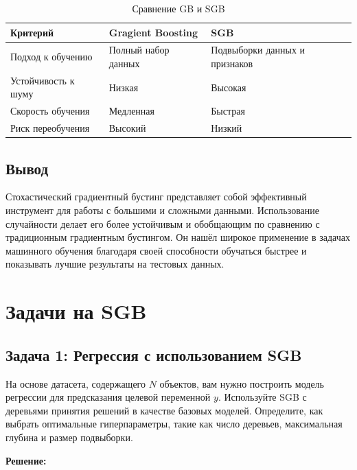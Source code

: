 \begin{table}[h!]
    \centering
    \begin{tabular}{|l|l|l|}
        \hline
        \textbf{Критерий} & \textbf{Gragient Boosting} & \textbf{SGB} \\
        \hline
        Подход к обучению & Полный набор данных                  & Подвыборки данных и признаков            \\
        \hline
        Устойчивость к шуму & Низкая                              & Высокая                                  \\
        \hline
        Скорость обучения  & Медленная                           & Быстрая                                  \\
        \hline
        Риск переобучения  & Высокий                             & Низкий                                   \\
        \hline
    \end{tabular}
    \caption{Сравнение GB и SGB}
\end{table}
\newpage
\subsection{Вывод}

Стохастический градиентный бустинг представляет собой эффективный инструмент для работы с большими и сложными данными. Использование случайности делает его более устойчивым и обобщающим по сравнению с традиционным градиентным бустингом. Он нашёл широкое применение в задачах машинного обучения благодаря своей способности обучаться быстрее и показывать лучшие результаты на тестовых данных.


\section{Задачи на SGB}

\subsection{Задача 1: Регрессия с использованием SGB}

На основе датасета, содержащего $N$ объектов, вам нужно построить модель регрессии для предсказания целевой переменной $y$. Используйте SGB с деревьями принятия решений в качестве базовых моделей. Определите, как выбрать оптимальные гиперпараметры, такие как число деревьев, максимальная глубина и размер подвыборки.

\textbf{Решение:}

